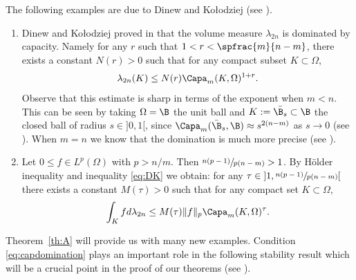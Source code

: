 The following examples are due to Dinew and Ko\l odziej (see \cite{DK14}).
\skpt
\begin{example}
\begin{enumerate}
\item
Dinew and Ko\l odziej proved in \cite{DK14} that the volume measure $\lambda_{2 n}$ is dominated by capacity. Namely for any $r$ such that $1 < r < \spfrac{m}{n - m}$, there exists a constant $N (r) > 0$ such that for any compact subset $K \subset \Omega$,
\begin{equation} \label{eq:DK}
\lambda_{2 n} (K) \leq N (r) \Capa_m (K,\Omega)^{1+ r}.
\end{equation}
Observe that this estimate is sharp in terms of the exponent when $m < n$. This can be seen by taking $\Omega = \B$ the unit ball and $K:= \bar{\B_s} \subset \B$ the closed ball of radius $s \in{}]0,1[$, since $\Capa_m(\bar{\B}_s,\B) \approx s^{2 (n-m)}$ as $s \to 0$ (see \cite{Lu12}).
When $m=n$ we know that the domination is much more precise (see \cite{ACKPZ09}).

\item
Let $ 0 \leq f \in L^p (\Omega)$ with $p > n \slash m$. Then $ \sfrac{n (p-1)}{p (n - m)} > 1$. By Hölder inequality and inequality \eqref{eq:DK} we obtain: for any $\tau\in{}]1,\sfrac{n (p-1)}{p (n - m)}[$ there exists a constant $M (\tau) > 0$ such that for any compact set $K \subset \Omega$,
\begin{equation} \label{eq:DK2}
\int_K f d \lambda_{2 n} \leq M (\tau) \Vert f\Vert_p \Capa_m (K,\Omega)^{\tau}.
\end{equation}
\end{enumerate}
\end{example}

Theorem~\ref{th:A} will provide us with many new examples. Condition \eqref{eq:capdomination} plays an important role in the following stability result which will be a crucial point in the proof of our theorems (see \cite{EGZ09, GKZ08, Ch16}).

